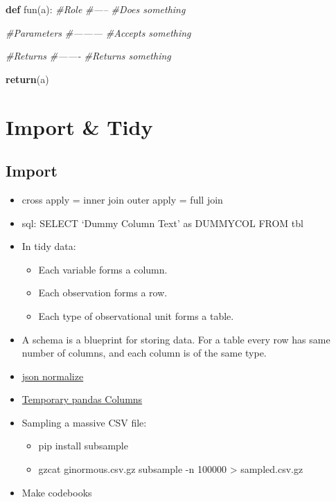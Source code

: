 \documentclass[]{book}
\newenvironment{Shaded}{\begin{snugshade}}{\end{snugshade}}
\newcommand{\KeywordTok}[1]{\textcolor[rgb]{0.13,0.29,0.53}{\textbf{#1}}}
\newcommand{\CommentTok}[1]{\textcolor[rgb]{0.56,0.35,0.01}{\textit{#1}}}
\newcommand{\ControlFlowTok}[1]{\textcolor[rgb]{0.13,0.29,0.53}{\textbf{#1}}}
\newcommand{\NormalTok}[1]{#1}
\providecommand{\tightlist}{%
  \setlength{\itemsep}{0pt}\setlength{\parskip}{0pt}}
\theoremstyle{definition}
\theoremstyle{definition}
\theoremstyle{definition}
\theoremstyle{remark}
\begin{document}
\begin{Shaded}
\begin{Highlighting}[]
\KeywordTok{def}\NormalTok{ fun(a):}
  \CommentTok{#Role}
  \CommentTok{#-----}
  \CommentTok{#Does something}
  
  \CommentTok{#Parameters}
  \CommentTok{#---------}
  \CommentTok{#Accepts something}
  
  \CommentTok{#Returns}
  \CommentTok{#-------}
  \CommentTok{#Returns something}
  
  \ControlFlowTok{return}\NormalTok{(a)}
\end{Highlighting}
\end{Shaded}

\chapter{Import \& Tidy}\label{import-tidy}

\section{Import}\label{import-1}

\begin{itemize}
\item
  cross apply = inner join \textbar{} outer apply = full join
\item
  sql: SELECT `Dummy Column Text' as DUMMYCOL FROM tbl
\item
  In tidy data:

  \begin{itemize}
  \tightlist
  \item
    Each variable forms a column.
  \item
    Each observation forms a row.
  \item
    Each type of observational unit forms a table.
  \end{itemize}
\item
  A schema is a blueprint for storing data. For a table every row has
  same number of columns, and each column is of the same type.
\item
  \href{http://pandas.pydata.org/pandas-docs/stable/generated/pandas.io.json.json_normalize.html}{json
  normalize}
\item
  \href{https://github.com/jreback/PyDataNYC2015/blob/master/whats-new-in-pandas/v0.16.x.ipynb}{Temporary
  pandas Columns}
\item
  Sampling a massive CSV file:

  \begin{itemize}
  \item
    pip install subsample
  \item
    gzcat ginormous.csv.gz \textbar{} subsample -n 100000 \textgreater{}
    sampled.csv.gz
  \end{itemize}
\item
  Make codebooks
\end{itemize}
\end{document}
